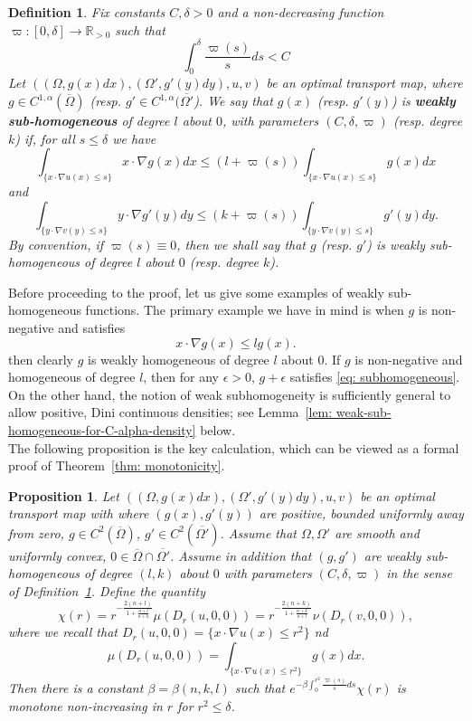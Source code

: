 \documentclass[12pt,reqno]{amsart}
\newtheorem{prop}{Proposition}[section]
\newtheorem{defn}{Definition}[section]
\numberwithin{equation}{section}
\begin{document}
\begin{defn}\label{defn: weaklySubHomog}
    Fix constants $C, \delta >0$ and a non-decreasing function $\varpi : [0,\delta]\rightarrow \mathbb{R}_{>0}$ such that
    \[
    \int_{0}^{\delta} \frac{\varpi(s)}{s} ds <C
    \]
    Let  $((\Omega, g(x)dx), (\Omega', g'(y)dy), u, v)$ be an optimal transport map, where $g \in C^{1,\alpha}(\overline{\Omega})$ (resp. $g' \in C^{1,\alpha}(\overline{\Omega'}$). We say that $g(x)$ (resp. $g'(y)$) is {\bf weakly sub-homogeneous} of degree $l$ about $0$, with parameters $(C,\delta,\varpi)$ (resp. degree $k$) if, for all $s\leq \delta$ we have
    \[
    \int_{\{x\cdot \nabla u(x) \leq s\}}x\cdot \nabla g(x)dx \leq (l+\varpi(s))\int_{\{x\cdot \nabla u(x) \leq s\}}g(x)dx
    \]
    and
    \[
    \int_{\{y\cdot \nabla v(y) \leq s\}}y\cdot \nabla g'(y)dy \leq (k+\varpi(s))\int_{\{y\cdot \nabla v(y) \leq s\}}g'(y)dy.
    \]
    By convention, if $\varpi(s) \equiv 0$, then we shall say that $g$ (resp. $g'$) is weakly sub-homogeneous of degree $l$ about $0$ (resp. degree $k$). 
    \end{defn}


Before proceeding to the proof, let us give some examples of weakly sub-homogeneous functions.  The primary example we have in mind is when $g$ is non-negative and  satisfies 
\begin{equation}\label{eq: subhomogeneous}
x\cdot \nabla g(x) \leq lg(x).
\end{equation}
then clearly $g$ is weakly homogeneous of degree $l$ about $0$.  If $g$ is non-negative and homogeneous of degree $l$, then for any $\epsilon>0$, $g+\epsilon$ satisfies \eqref{eq: subhomogeneous}.   On the other hand, the notion of weak subhomogeneity is sufficiently general to allow positive, Dini continuous densities; see Lemma~\ref{lem: weak-sub-homogeneous-for-C-alpha-density} below.
\\

The following proposition is the key calculation, which can be viewed as a formal proof of Theorem~\ref{thm: monotonicity}.

\begin{prop}\label{prop: monotonicityRegularized}
    Let  $((\Omega, g(x)dx), (\Omega', g'(y)dy), u, v)$ be an optimal transport map with  where $(g(x), g'(y))$ are positive, bounded uniformly away from zero, $g\in  C^{2}(\overline{\Omega})$, $g' \in C^{2}(\overline{\Omega'})$. Assume that $\Omega, \Omega'$ are smooth and uniformly convex,  $0\in \overline\Omega\cap\overline{\Omega'}$. Assume in addition that $(g,g')$ are weakly sub-homogeneous of degree $(l,k)$ about $0$ with parameters $(C,\delta, \varpi)$ in the sense of Definition~\ref{defn: weaklySubHomog}. Define the quantity
	\[\chi(r) = r^{-\frac{2(n+l)}{1+\frac{n+l}{n+k}}}\mu(D_r(u,0, 0)) = r^{-\frac{2(n+k)}{1+\frac{n+k}{n+l}}}\nu(D_r(v,0, 0)),\]
     where we recall that $D_r(u,0,0)=\{x\cdot \nabla u(x)\leq r^2\}$ nd
     \[\mu(D_r(u, 0,0)) = \int_{\{x\cdot \nabla u(x)\leq r^2\}}g(x)dx.\] 
     Then there is a constant $\beta = \beta (n, k, l)$ such that $e^{-\beta \int_{0}^{r^2}\frac{\varpi(s)}{s}ds}\chi(r)$
    is monotone non-increasing in $r$ for $r^2 \leq \delta$.
\end{prop}
\end{document}
